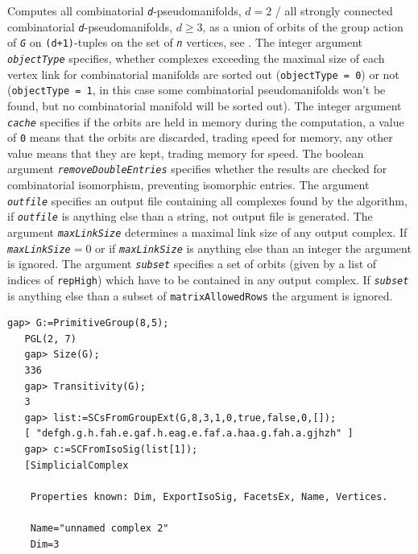 \documentclass[a4paper,11pt]{report}
\begin{document}
{{{ Computes all combinatorial \mbox{\texttt{\mdseries\slshape d}}-pseudomanifolds, $d=2$ / all strongly connected combinatorial \mbox{\texttt{\mdseries\slshape d}}-pseudomanifolds, $d \geq 3$, as a union of orbits of the group action of \mbox{\texttt{\mdseries\slshape G}} on \texttt{(d+1)}-tuples on the set of \mbox{\texttt{\mdseries\slshape n}} vertices, see \cite{Lutz03TrigMnfFewVertVertTrans}. The integer argument \mbox{\texttt{\mdseries\slshape objectType}} specifies, whether complexes exceeding the maximal size of each vertex link
for combinatorial manifolds are sorted out (\texttt{objectType = 0}) or not (\texttt{objectType = 1}, in this case some combinatorial pseudomanifolds won't be found, but no
combinatorial manifold will be sorted out). The integer argument \mbox{\texttt{\mdseries\slshape cache}} specifies if the orbits are held in memory during the computation, a value of \texttt{0} means that the orbits are discarded, trading speed for memory, any other value
means that they are kept, trading memory for speed. The boolean argument \mbox{\texttt{\mdseries\slshape removeDoubleEntries}} specifies whether the results are checked for combinatorial isomorphism,
preventing isomorphic entries. The argument \mbox{\texttt{\mdseries\slshape outfile}} specifies an output file containing all complexes found by the algorithm, if \mbox{\texttt{\mdseries\slshape outfile}} is anything else than a string, not output file is generated. The argument \mbox{\texttt{\mdseries\slshape maxLinkSize}} determines a maximal link size of any output complex. If \mbox{\texttt{\mdseries\slshape maxLinkSize}}$=0$ or if \mbox{\texttt{\mdseries\slshape maxLinkSize}} is anything else than an integer the argument is ignored. The argument \mbox{\texttt{\mdseries\slshape subset}} specifies a set of orbits (given by a list of indices of \texttt{repHigh}) which have to be contained in any output complex. If \mbox{\texttt{\mdseries\slshape subset}} is anything else than a subset of \texttt{matrixAllowedRows} the argument is ignored. 
\begin{Verbatim}[commandchars=!@|,fontsize=\small,frame=single,label=Example]
   gap> G:=PrimitiveGroup(8,5);
   PGL(2, 7)
   gap> Size(G);
   336
   gap> Transitivity(G);
   3
   gap> list:=SCsFromGroupExt(G,8,3,1,0,true,false,0,[]);
   [ "defgh.g.h.fah.e.gaf.h.eag.e.faf.a.haa.g.fah.a.gjhzh" ]
   gap> c:=SCFromIsoSig(list[1]);
   [SimplicialComplex
   
    Properties known: Dim, ExportIsoSig, FacetsEx, Name, Vertices.
   
    Name="unnamed complex 2"
    Dim=3
   

\end{Verbatim}}}}
\end{document}
